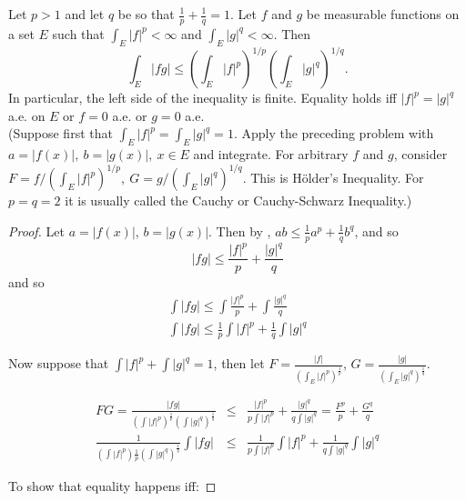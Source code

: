 \begin{pblm}%
	Let $p > 1$ and let $q$ be so that $\frac{1}{p} + \frac{1}{q} = 1$. Let $f$ and $g$ 
	be measurable functions on a set $E$ such that $\int_E |f|^p < \infty$ and 
	$\int_E|g|^q<\infty$. Then 
	\begin{equation*}
		\int_E|fg|\le\left(\int_E|f|^p\right)^{1/p}\left(\int_E|g|^q\right)^{1/q}. 
	\end{equation*}
	In particular, the left side of the inequality is finite. Equality holds iff 
	$|f|^p = |g|^q$ a.e. on $E$ or $f = 0$ a.e. or $g=0$ a.e. \\
	{\scriptsize{(Suppose first that $\int_E|f|^p = \int_E|g|^q=1$. Apply the preceding 
	problem with $a=|f(x)|,~b=|g(x)|,~x\in E$ and integrate. For arbitrary $f$ and $g$, 
	consider $F = f/(\int_E|f|^p)^{1/p},~G=g/(\int_E|g|^q)^{1/q}$. This is H\"{o}lder's 
	Inequality. For $p = q = 2$ it is usually called the Cauchy or Cauchy-Schwarz Inequality.)}}
\begin{proof}
	Let $a = |f(x)|$, $b = |g(x)|$. Then by , 
	$ab \le \frac{1}{p}a^p + \frac{1}{q}b^q$, and so 
	\begin{equation*}
		|fg| \le \frac{|f|^p}{p} + \frac{|g|^q}{q}
	\end{equation*}
	and so 
	\begin{equation*}
	\begin{array}{c}
		\int |fg| \le \int \frac{|f|^p}{p} + \int \frac{|g|^q}{q}\\
		\int |fg| \le \frac{1}{p}\int |f|^p + \frac{1}{q}\int |g|^q
	\end{array}
	\end{equation*}

	Now suppose that $\int |f|^p + \int|g|^q = 1$, then let 
	$F = \frac{|f|}{\left(\int_E|f|^p\right)^\frac{1}{p}}$, 
	$G = \frac{|g|}{\left(\int_E|g|^q\right)^\frac{1}{q}}$.  

	\begin{equation*}
	\begin{array}{rcl}
		FG  = \frac{|fg|}{\left(\int|f|^p\right)^\frac{1}{p}\left(\int|g|^q\right)^\frac{1}{q}} & \le & 
			\frac{|f|^p}{p\int|f|^p} + \frac{|g|^q}{q\int|g|^q} = \frac{F^p}{p} + \frac{G^q}{q}\\
		\frac{1}{\left(\int|f|^p\right)\frac{1}{p}\left(\int|g|^q\right)^\frac{1}{q}}\int |fg| & \le & 
			\frac{1}{p\int|f|^p}\int|f|^p + \frac{1}{q\int|g|^q}\int |g|^q
	\end{array}
	\end{equation*}

	To show that equality happens iff: 
\end{proof}
\end{pblm}

